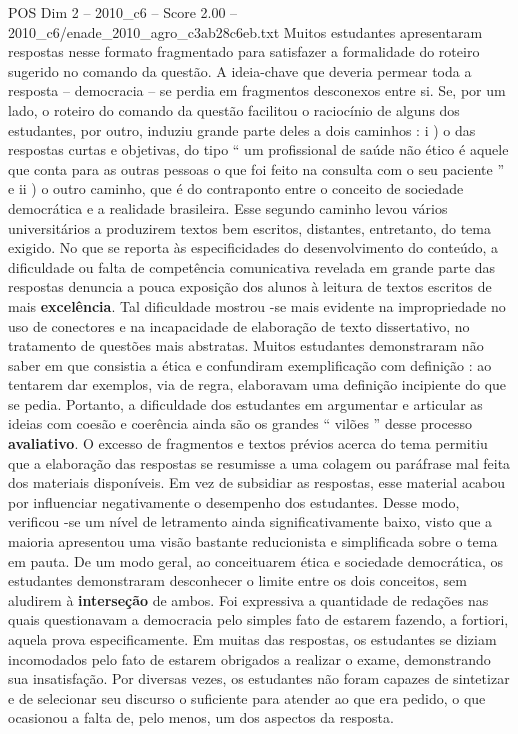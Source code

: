 \begin{textsample}{POS Dim 2 – 2010\_c6 – Score 2.00 – 2010\_c6/enade\_2010\_agro\_c3ab28c6eb.txt}
Muitos estudantes apresentaram respostas nesse formato fragmentado para satisfazer a formalidade do roteiro sugerido no comando da questão.
A ideia-chave que deveria permear toda a resposta – democracia – se perdia em fragmentos desconexos entre si.
Se, por um lado, o roteiro do comando da questão facilitou o raciocínio de alguns dos estudantes, por outro, induziu grande parte deles a dois caminhos : i ) o das respostas curtas e objetivas, do tipo “ um profissional de saúde não ético é aquele que conta para as outras pessoas o que foi feito na consulta com o seu paciente ” e ii ) o outro caminho, que é do contraponto entre o conceito de sociedade democrática e a realidade brasileira.
Esse segundo caminho levou vários universitários a produzirem textos bem escritos, distantes, entretanto, do tema exigido.
No que se reporta às especificidades do desenvolvimento do conteúdo, a dificuldade ou falta de competência comunicativa revelada em grande parte das respostas denuncia a pouca exposição dos alunos à leitura de textos escritos de mais \textbf{excelência}.
Tal dificuldade mostrou -se mais evidente na impropriedade no uso de conectores e na incapacidade de elaboração de texto dissertativo, no tratamento de questões mais abstratas.
Muitos estudantes demonstraram não saber em que consistia a ética e confundiram exemplificação com definição : ao tentarem dar exemplos, via de regra, elaboravam uma definição incipiente do que se pedia.
Portanto, a dificuldade dos estudantes em argumentar e articular as ideias com coesão e coerência ainda são os grandes “ vilões ” desse processo \textbf{avaliativo}.
O excesso de fragmentos e textos prévios acerca do tema permitiu que a elaboração das respostas se resumisse a uma colagem ou paráfrase mal feita dos materiais disponíveis.
Em vez de subsidiar as respostas, esse material acabou por influenciar negativamente o desempenho dos estudantes.
Desse modo, verificou -se um nível de letramento ainda significativamente baixo, visto que a maioria apresentou uma visão bastante reducionista e simplificada sobre o tema em pauta.
De um modo geral, ao conceituarem ética e sociedade democrática, os estudantes demonstraram desconhecer o limite entre os dois conceitos, sem aludirem à \textbf{interseção} de ambos.
Foi expressiva a quantidade de redações nas quais questionavam a democracia pelo simples fato de estarem fazendo, a fortiori, aquela prova especificamente.
Em muitas das respostas, os estudantes se diziam incomodados pelo fato de estarem obrigados a realizar o exame, demonstrando sua insatisfação.
Por diversas vezes, os estudantes não foram capazes de sintetizar e de selecionar seu discurso o suficiente para atender ao que era pedido, o que ocasionou a falta de, pelo menos, um dos aspectos da resposta.

\end{textsample}
